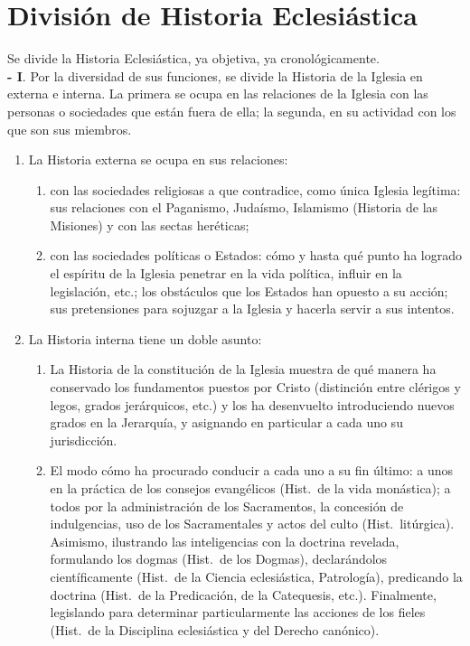\raggedbottom{} \documentclass[12pt, a4paper, openany]{book} %
\begin{document}
\section{División de Historia Eclesiástica}
Se divide la Historia Eclesiástica, ya objetiva, ya cronológicamente.\\
\textbf{- I}. Por la diversidad de sus funciones, se divide la Historia
de la Iglesia en externa e interna. La primera se ocupa en las relaciones de la Iglesia con las personas o sociedades que están fuera de ella; la segunda, en su actividad con los que son sus miembros.
\begin{enumerate}
  \item La Historia externa se ocupa en sus relaciones: \begin{enumerate}
          \item con las sociedades religiosas a que contradice, como única Iglesia legítima: sus relaciones con el Paganismo, Judaísmo, Islamismo (Historia de las Misiones) y con las sectas heréticas;
          \item con las sociedades políticas o Estados: cómo y hasta qué punto ha logrado el espíritu de la Iglesia penetrar en la vida política, influir en la legislación, etc.; los obstáculos que los Estados han opuesto a su acción; sus pretensiones para sojuzgar a la Iglesia y hacerla servir a sus intentos.
        \end{enumerate}
  \item La Historia interna tiene un doble asunto: \begin{enumerate}
          \item La Historia de la constitución de la Iglesia muestra de qué manera ha conservado los fundamentos puestos por Cristo (distinción entre clérigos y legos, grados jerárquicos, etc.) y los ha desenvuelto introduciendo nuevos grados en la Jerarquía, y asignando en particular a cada uno su jurisdicción.
          \item El modo cómo ha procurado conducir a cada uno a su fin último: a unos en la práctica de los consejos evangélicos (Hist.\ de la vida monástica); a todos por la administración de los Sacramentos, la concesión de indulgencias, uso de los Sacramentales y actos del culto (Hist.\ litúrgica). Asimismo, ilustrando las inteligencias con la doctrina revelada, formulando los dogmas (Hist.\ de los Dogmas), declarándolos científicamente (Hist.\ de la Ciencia eclesiástica, Patrología), predicando la doctrina (Hist.\ de la Predicación, de la Catequesis, etc.). Finalmente, legislando para determinar particularmente las acciones de los fieles (Hist.\ de la Disciplina eclesiástica y del Derecho canónico).

        \end{enumerate}
\end{enumerate}
\end{document}
